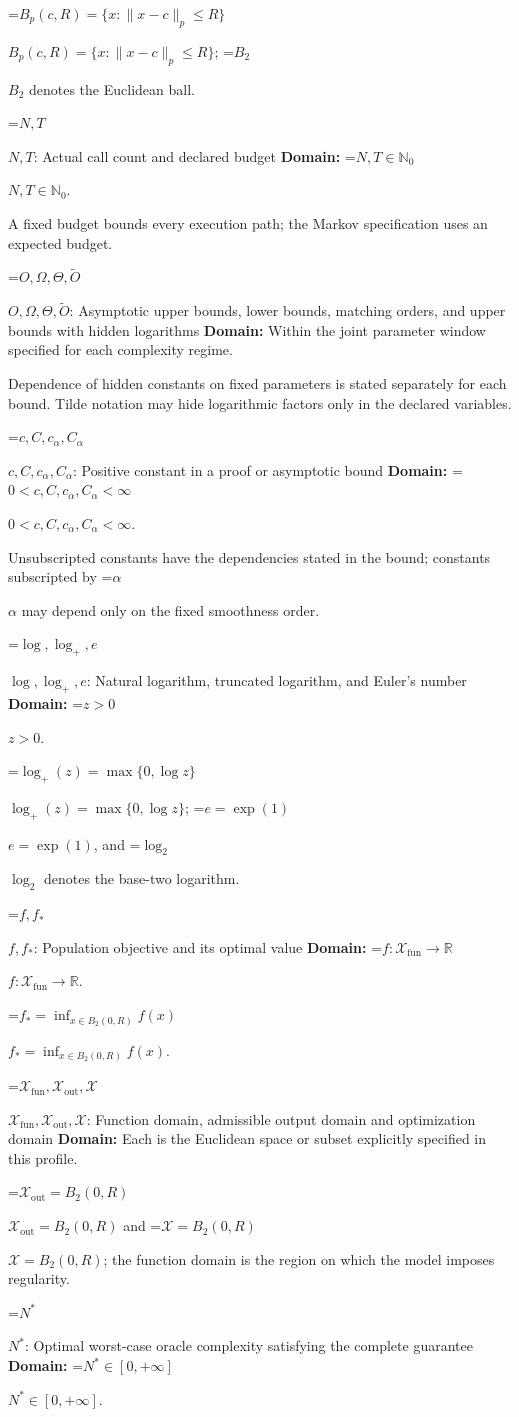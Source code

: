 \documentclass[10pt,a4paper]{article}
\newcommand{\AtlasMath}[1]{\par\begingroup\centering\setbox0=\hbox{$\displaystyle #1$}\ifdim\wd0>1.4\linewidth\typeout{ATLAS WIDE FORMULA: \the\wd0}\fi\ifdim\wd0>\linewidth\resizebox{\linewidth}{!}{\box0}\else\box0\fi\par\endgroup}
\newcommand{\AtlasInlineMath}[1]{\begingroup\setbox0=\hbox{$#1$}\ifdim\wd0>.4\linewidth\endgroup\AtlasMath{#1}\else\endgroup$#1$\fi}
\begin{document}
\AtlasInlineMath{B_p(c,R)=\{x:\|x-c\|_p\le R\}}; \AtlasInlineMath{B_2} denotes the Euclidean ball.

\AtlasInlineMath{N,T}: Actual call count and declared budget \textbf{Domain:} \AtlasInlineMath{N,T\in\mathbb{N}_0}.

A fixed budget bounds every execution path; the Markov specification uses an expected budget.

\AtlasInlineMath{O,\Omega,\Theta,\widetilde{O}}: Asymptotic upper bounds, lower bounds, matching orders, and upper bounds with hidden logarithms \textbf{Domain:} Within the joint parameter window specified for each complexity regime.

Dependence of hidden constants on fixed parameters is stated separately for each bound. Tilde notation may hide logarithmic factors only in the declared variables.

\AtlasInlineMath{c,C,c_\alpha,C_\alpha}: Positive constant in a proof or asymptotic bound \textbf{Domain:} \AtlasInlineMath{0<c,C,c_\alpha,C_\alpha<\infty}.

Unsubscripted constants have the dependencies stated in the bound; constants subscripted by \AtlasInlineMath{\alpha} may depend only on the fixed smoothness order.

\AtlasInlineMath{\log,\log_+,e}: Natural logarithm, truncated logarithm, and Euler's number \textbf{Domain:} \AtlasInlineMath{z>0}.

\AtlasInlineMath{\log_+(z)=\max\{0,\log z\}}; \AtlasInlineMath{e=\exp(1)}, and \AtlasInlineMath{\log_2} denotes the base-two logarithm.

\AtlasInlineMath{f,f_*}: Population objective and its optimal value \textbf{Domain:} \AtlasInlineMath{f:\mathcal{X}_{\mathrm{fun}}\to\mathbb{R}}.

\AtlasInlineMath{f_*=\inf_{x\in B_2(0,R)}f(x)}.

\AtlasInlineMath{\mathcal{X}_{\mathrm{fun}},\mathcal{X}_{\mathrm{out}},\mathcal{X}}: Function domain, admissible output domain and optimization domain \textbf{Domain:} Each is the Euclidean space or subset explicitly specified in this profile.

\AtlasInlineMath{\mathcal{X}_{\mathrm{out}}=B_2(0,R)} and \AtlasInlineMath{\mathcal{X}=B_2(0,R)}; the function domain is the region on which the model imposes regularity.

\AtlasInlineMath{N^*}: Optimal worst-case oracle complexity satisfying the complete guarantee \textbf{Domain:} \AtlasInlineMath{N^*\in[0,+\infty]}.
\end{document}
